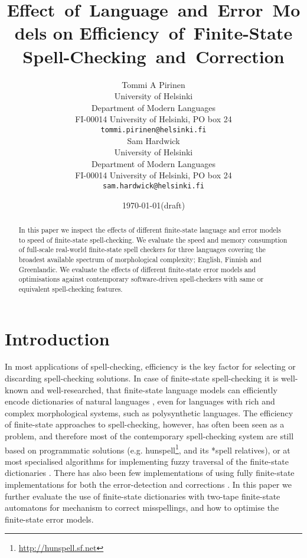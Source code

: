 \documentclass[11pt]{article}
\title{Effect~of~Language~and~Error~Models on Efficiency~of~Finite-State
Spell-Checking~and~Correction}
\author{
Tommi A Pirinen\\
University of Helsinki\\
Department of Modern Languages\\
FI-00014 University of Helsinki, PO box 24\\
{\tt tommi.pirinen@helsinki.fi} \\\And
Sam Hardwick\\
University of Helsinki\\
Department of Modern Languages\\
FI-00014 University of Helsinki, PO box 24\\
{\tt sam.hardwick@helsinki.fi} \\
}
\date{\today (draft)}
\begin{document}
\maketitle
\begin{abstract}
In this paper we inspect the effects of different finite-state language
and error models to speed of finite-state spell-checking. We evaluate the
speed and memory consumption of full-scale real-world finite-state spell checkers
for three languages covering the broadest available spectrum of morphological
complexity; English, Finnish and Greenlandic. We evaluate the effects of
different finite-state error models and optimisations against contemporary
software-driven spell-checkers with same or equivalent spell-checking features.
\end{abstract}

\section{Introduction}
\label{sec:introduction}

In most applications of spell-checking, efficiency is the key factor for
selecting or discarding spell-checking solutions. In case of finite-state
spell-checking it is well-known and well-researched, that finite-state language
models can efficiently encode dictionaries of natural languages
\cite{beesley/2003}, even for languages with rich and complex morphological
systems, such as polysynthetic languages. The efficiency of finite-state
approaches to spell-checking, however, has often been seen as a problem, and
therefore most of the contemporary spell-checking system are still based on
programmatic solutions (e.g. hunspell\footnote{\url{http://hunspell.sf.net}},
and its *spell relatives), or at most specialised algorithms for implementing
fuzzy traversal of the finite-state dictionaries
\cite{oflazer/1996,hulden/2009}. There has also been few implementations of
using fully finite-state implementations for both the error-detection and
corrections \cite{schulz/2002,pirinen/2010/lrec}. In this paper we further evaluate
the use of finite-state dictionaries with two-tape finite-state automatons for
mechanism to correct misspellings, and how to optimise the finite-state error
models. 
\end{document}
